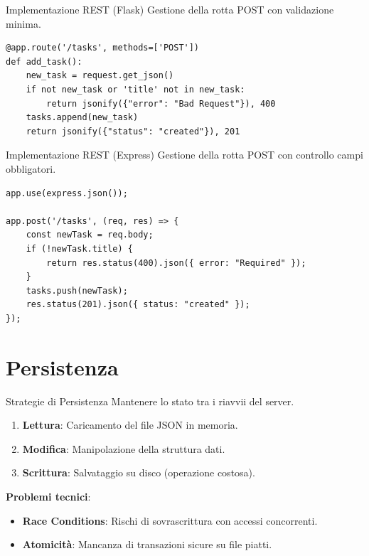 \documentclass[10pt]{beamer}
\begin{document}
\begin{frame}[fragile]{Implementazione REST (Flask)}
    Gestione della rotta POST con validazione minima.
    \begin{verbatim}
@app.route('/tasks', methods=['POST'])
def add_task():
    new_task = request.get_json()
    if not new_task or 'title' not in new_task:
        return jsonify({"error": "Bad Request"}), 400
    tasks.append(new_task)
    return jsonify({"status": "created"}), 201
    \end{verbatim}
\end{frame}

\begin{frame}[fragile]{Implementazione REST (Express)}
    Gestione della rotta POST con controllo campi obbligatori.
    \begin{verbatim}
app.use(express.json());

app.post('/tasks', (req, res) => {
    const newTask = req.body;
    if (!newTask.title) {
        return res.status(400).json({ error: "Required" });
    }
    tasks.push(newTask);
    res.status(201).json({ status: "created" });
});
    \end{verbatim}
\end{frame}

\section{Persistenza}
\begin{frame}{Strategie di Persistenza}
    Mantenere lo stato tra i riavvii del server.
    \begin{enumerate}
        \item \textbf{Lettura}: Caricamento del file JSON in memoria.
        \item \textbf{Modifica}: Manipolazione della struttura dati.
        \item \textbf{Scrittura}: Salvataggio su disco (operazione costosa).
    \end{enumerate}
    \vspace{0.2cm}
    \textbf{Problemi tecnici}:
    \begin{itemize}
        \item \textbf{Race Conditions}: Rischi di sovrascrittura con accessi concorrenti.
        \item \textbf{Atomicità}: Mancanza di transazioni sicure su file piatti.
    \end{itemize}
\end{frame}
\end{document}
